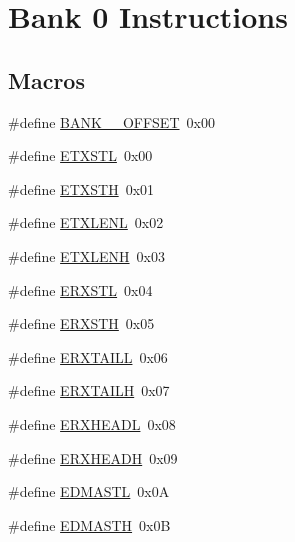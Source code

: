 \hypertarget{group___b_a_n_k__0}{}\section{Bank 0 Instructions}
\label{group___b_a_n_k__0}
\subsection*{Macros}
\begin{DoxyCompactItemize}
\item 
\#define \mbox{\hyperlink{group___b_a_n_k__0_ga66d34711bf1b18dddae4db092c250451}{B\+A\+N\+K\+\_\+\_\+\+O\+F\+F\+S\+ET}}~0x00
\item 
\#define \mbox{\hyperlink{group___b_a_n_k__0_ga45a38712c4d618bb5cb013e3d781db46}{E\+T\+X\+S\+TL}}~0x00
\item 
\#define \mbox{\hyperlink{group___b_a_n_k__0_gadfc695618aa5a32160cc9e2b0234c714}{E\+T\+X\+S\+TH}}~0x01
\item 
\#define \mbox{\hyperlink{group___b_a_n_k__0_gaabce294609dfd914fcc09bbe4c4dcf75}{E\+T\+X\+L\+E\+NL}}~0x02
\item 
\#define \mbox{\hyperlink{group___b_a_n_k__0_ga0b19f954414d0b99eac5e44f9f6b7ffd}{E\+T\+X\+L\+E\+NH}}~0x03
\item 
\#define \mbox{\hyperlink{group___b_a_n_k__0_ga387e1ac675539e1c0c7f158f59eafd51}{E\+R\+X\+S\+TL}}~0x04
\item 
\#define \mbox{\hyperlink{group___b_a_n_k__0_gad4c2a40d74ded1e155f7eb18effb76ba}{E\+R\+X\+S\+TH}}~0x05
\item 
\#define \mbox{\hyperlink{group___b_a_n_k__0_gaf3b3b39a7b4d282655be48a7d6644b16}{E\+R\+X\+T\+A\+I\+LL}}~0x06
\item 
\#define \mbox{\hyperlink{group___b_a_n_k__0_ga5dc63cf151dc56e1c6dffbac3e33a6b9}{E\+R\+X\+T\+A\+I\+LH}}~0x07
\item 
\#define \mbox{\hyperlink{group___b_a_n_k__0_gae2bce69021e980e000c605b1c891a957}{E\+R\+X\+H\+E\+A\+DL}}~0x08
\item 
\#define \mbox{\hyperlink{group___b_a_n_k__0_ga1ed2ae5dd309b9fb325be27aec0d5da4}{E\+R\+X\+H\+E\+A\+DH}}~0x09
\item 
\#define \mbox{\hyperlink{group___b_a_n_k__0_gae7f7aba80e78f4086dc761608c2da2c4}{E\+D\+M\+A\+S\+TL}}~0x0A
\item 
\#define \mbox{\hyperlink{group___b_a_n_k__0_ga0b279b45e0cfbc32896ec3b68694cf71}{E\+D\+M\+A\+S\+TH}}~0x0B
\item 

\end{DoxyCompactItemize}
